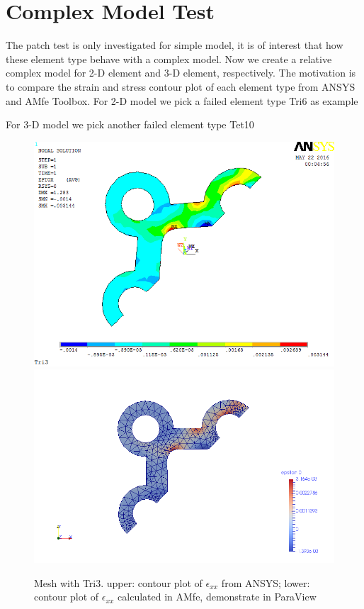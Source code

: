 \section{Complex Model Test}
The patch test is only investigated for simple model, it is of interest that how these element type behave with a complex model. Now we create a relative complex model for 2-D element and 3-D element, respectively. The motivation is to compare the strain and stress contour plot of each element type from ANSYS and AMfe Toolbox. For 2-D model we pick a failed element type Tri6 as example



For 3-D model we pick another failed element type Tet10

\begin{figure}[htbp]
	\begin{center}
		\includegraphics[width=13cm,clip]{TTri3_Exx.png} 		
		\includegraphics[width=13cm,clip]{TTri3_Exx_P.png} 		
		\caption{Mesh with Tri3. upper: contour plot of $\epsilon_{xx}$ from ANSYS; lower: contour plot of $\epsilon_{xx}$ calculated in AMfe, demonstrate in ParaView} \label{fig: Tri3_Exx}
	\end{center}
\end{figure}
\clearpage 

